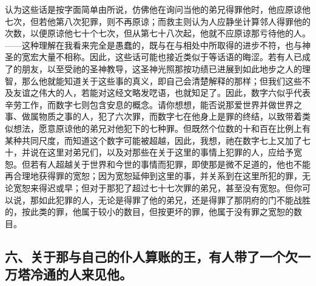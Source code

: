 认为这些话是按字面简单由所说，仿佛他在询问当他的弟兄得罪他时，他应原谅他七次，但若他第八次犯罪，则不再原谅；而救主则认为人应静坐计算邻人得罪他的次数，以便原谅他七十个七次，但从第七十八次起，他就不应原谅那亏待他的人。——这种理解在我看来完全是愚蠢的，既与在与相处中所取得的进步不符，也与神圣的宽宏大量不相称。因此，这些话可能也接近类似于等话语的晦涩。若有人已成了的朋友，以至受祂的圣神教导，这圣神光照那按功绩已进展到如此地步之人的理智，那么他就能知道关于这些事的真义，即自己会清楚解释的那样；但我们这些不及友谊之伟大的人，若能对这经文略发呓语，也就知足了。因此，数字六似乎代表辛劳工作，而数字七则包含安息的概念。请你想想，能否说那爱世界并做世界之事、做属物质之事的人，犯了六次罪，而数字七在他身上是罪的终结，以致带着类似想法，愿意原谅他的弟兄对他犯下的七种罪。但既然个位数的十和百在比例上有某种共同尺度，而知道这个数字可能被超越，因此，我想，祂在数字七上又加了七十，并说在这里对弟兄们，以及对那些在关于这里的事情上犯罪的人，应给予宽恕。但若有人超越关于世界和今世的事情而犯罪，即使那是微不足道的，他也不能再合理地获得罪的宽恕；因为宽恕延伸到这里的事，并关系到在这里所犯的罪，无论宽恕来得迟或早；但对于那犯了超过七十七次罪的弟兄，甚至没有宽恕。但你可以说，那如此犯罪的人，无论是得罪了他的弟兄，还是得罪了那阴府的门不能战胜的，按此类的罪，他属于较小的数目，但按更坏的罪，他属于没有罪之宽恕的数目。\par


\subsection{六、关于那与自己的仆人算账的王，有人带了一个欠一万塔冷通的人来见他。}

